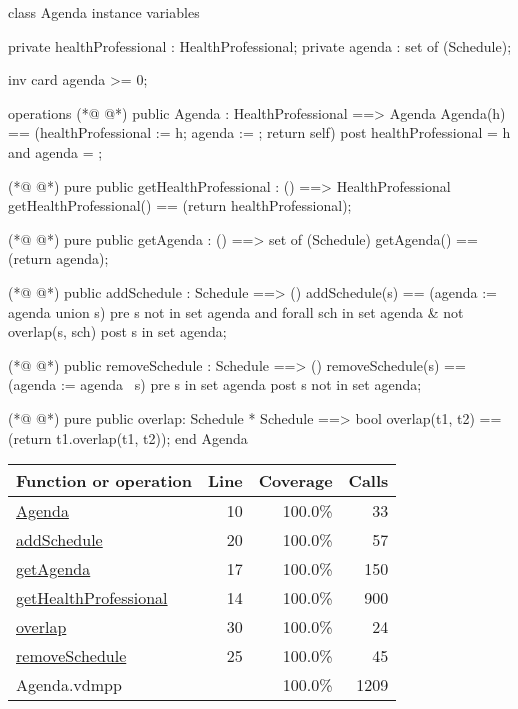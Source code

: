 \begin{vdmpp}[breaklines=true]
class Agenda
instance variables

private healthProfessional : HealthProfessional;
private agenda : set of (Schedule);

inv card agenda >= 0;

operations
(*@
\label{Agenda:10}
@*)
 public Agenda : HealthProfessional ==> Agenda
  Agenda(h) == (healthProfessional := h; agenda := {}; return self)
 post healthProfessional = h and agenda = {};
 
(*@
\label{getHealthProfessional:14}
@*)
 pure public getHealthProfessional : () ==> HealthProfessional
  getHealthProfessional() == (return healthProfessional);
 
(*@
\label{getAgenda:17}
@*)
 pure public getAgenda : () ==> set of (Schedule)
  getAgenda() == (return agenda);
 
(*@
\label{addSchedule:20}
@*)
 public addSchedule : Schedule ==> ()
  addSchedule(s) == (agenda := agenda union {s})
 pre s not in set agenda and forall sch in set agenda & not overlap(s, sch)
 post s in set agenda;
 
(*@
\label{removeSchedule:25}
@*)
 public removeSchedule : Schedule ==> ()
  removeSchedule(s) == (agenda := agenda \ {s})
 pre s in set agenda
 post s not in set agenda;
 
(*@
\label{overlap:30}
@*)
 pure public overlap: Schedule * Schedule ==> bool
  overlap(t1, t2) == (return t1.overlap(t1, t2));
end Agenda
\end{vdmpp}
\bigskip
\begin{longtable}{|l|r|r|r|}
\hline
Function or operation & Line & Coverage & Calls \\
\hline
\hline
\hyperref[Agenda:10]{Agenda} & 10&100.0\% & 33 \\
\hline
\hyperref[addSchedule:20]{addSchedule} & 20&100.0\% & 57 \\
\hline
\hyperref[getAgenda:17]{getAgenda} & 17&100.0\% & 150 \\
\hline
\hyperref[getHealthProfessional:14]{getHealthProfessional} & 14&100.0\% & 900 \\
\hline
\hyperref[overlap:30]{overlap} & 30&100.0\% & 24 \\
\hline
\hyperref[removeSchedule:25]{removeSchedule} & 25&100.0\% & 45 \\
\hline
\hline
Agenda.vdmpp & & 100.0\% & 1209 \\
\hline
\end{longtable}

